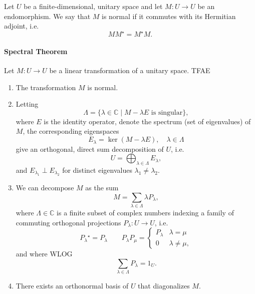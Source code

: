 \documentclass[12pt]{article}
\newcommand{\cnums}{\mathbb{C}}
\newcommand{\adj}{^{\displaystyle \star}}
\begin{document}
Let $U$ be a finite-dimensional, unitary space and let $M:U\rightarrow
U$ be an endomorphism.  We say that $M$ is normal if it commutes with
its Hermitian adjoint, i.e.
$$MM\adj= M\adj M.$$

\paragraph{Spectral Theorem}
Let $M:U\rightarrow U$ be a linear transformation of a unitary space.
TFAE
\begin{enumerate}
\item The transformation $M$ is normal.
\item Letting
  $$\Lambda=\{\lambda\in\cnums \mid M-\lambda E \mbox{ is singular}\},$$
  where $E$ is the identity operator,
  denote the spectrum (set of eigenvalues) of $M$, the corresponding
  eigenspaces
  $$E_\lambda=\ker(M-\lambda E),\quad \lambda\in\Lambda$$
  give an orthogonal, direct sum
  decomposition of $U$, i.e. 
  $$U=\bigoplus_{\lambda\in\Lambda} E_\lambda,$$
  and $E_{\lambda_1}
  \perp E_{\lambda_2}$ for distinct eigenvalues $\lambda_1\neq
  \lambda_2$.
\item We can decompose $M$ as the sum
  $$M = \sum_{\lambda\in \Lambda} \lambda P_\lambda,$$
  where  $\Lambda\in\cnums$ is  a finite subset of complex numbers
  indexing a family of commuting orthogonal projections
  $P_\lambda:U\rightarrow U$, i.e.
  $$
    P_\lambda{}\adj = P_\lambda \qquad
    P_\lambda P_\mu =
    \begin{cases}
      P_\lambda & \lambda = \mu \\
      0 & \lambda\neq \mu,
    \end{cases}
    $$
    and where WLOG
  $$\sum_{\lambda\in\Lambda} P_\lambda = 1_U.$$
\item There exists an orthonormal basis of $U$ that diagonalizes $M$.
\end{enumerate}
\end{document}
